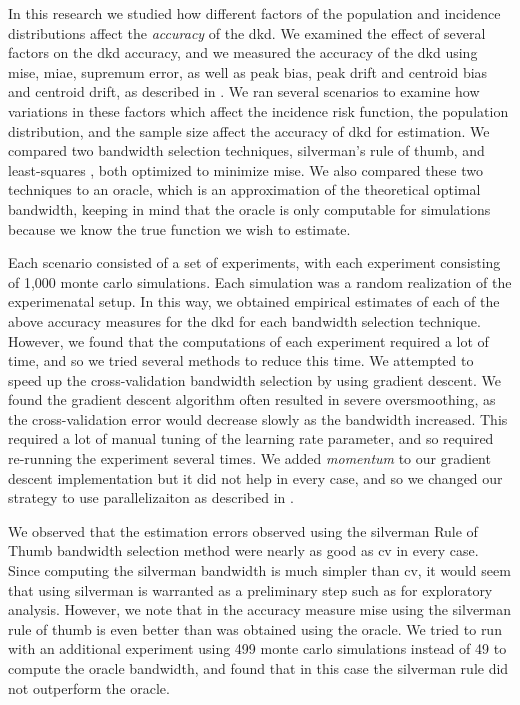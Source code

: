 

In this research we studied how different factors of the population and incidence distributions
affect the \textit{accuracy} of the \gls{dkd}.
We examined the effect of several factors on the \gls{dkd} accuracy,
and we measured the accuracy of the \gls{dkd} using \gls{mise},
\gls{miae}, \gls{supremum error}, as well as \gls{peak bias},
\gls{peak drift} and \gls{centroid bias} and \gls{centroid drift},
as described in .
We ran several scenarios to examine how variations in these factors which affect the incidence risk function,
the population distribution, and the sample size affect the accuracy of \gls{dkd} for estimation.
We compared two bandwidth selection techniques, \gls{silverman}'s rule of thumb,
and least-squares ,
both optimized to minimize \gls{mise}.
We also compared these two techniques to an \gls{oracle},
which is an approximation of the theoretical optimal bandwidth,
keeping in mind that the oracle is only computable for simulations because we know the true function we wish to estimate.

Each scenario consisted of a set of experiments,
with each experiment consisting of 1,000 monte carlo simulations.
Each simulation was a random realization of the experimenatal setup.
In this way,
we obtained empirical estimates of each of the above accuracy measures for the \gls{dkd}
for each bandwidth selection technique.
However,
we found that the computations of each experiment required a lot of time,
and so we tried several methods to reduce this time.
We attempted to speed up the cross-validation bandwidth selection by using gradient descent.
We found the gradient descent algorithm often resulted in severe oversmoothing,
as the cross-validation error would decrease slowly as the bandwidth increased.
This required a lot of manual tuning of the learning rate parameter,
and so required re-running the experiment several times.
We added \textit{momentum} to our gradient descent implementation but it did not help in every case,
and so we changed our strategy to use parallelizaiton as described in .

We observed that the estimation errors observed using the \gls{silverman} Rule of Thumb bandwidth selection method
were nearly as good as \gls{cv} in every case.
Since computing the \gls{silverman} bandwidth is much simpler than \gls{cv},
it would seem that using \gls{silverman} is warranted as a preliminary step such as for exploratory analysis.
However,
we note that in  the accuracy measure \gls{mise} using the \gls{silverman} rule of thumb is even better than was obtained using the \gls{oracle}.
We tried to run with an additional experiment using 499 monte carlo simulations instead of 49 to compute the oracle bandwidth,
and found that in this case the \gls{silverman} rule did not outperform the \gls{oracle}.

